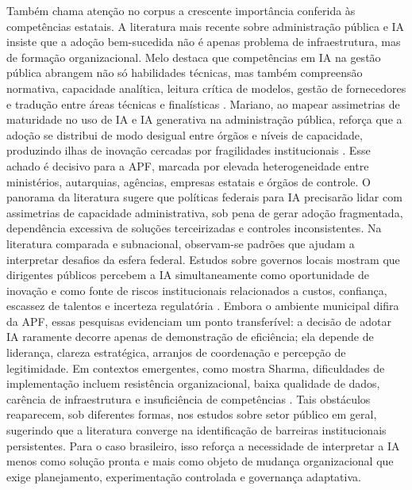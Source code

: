 \documentclass[12pt,a4paper]{article}
\begin{document}
Também chama atenção no corpus a crescente importância conferida às competências estatais. A literatura mais recente sobre administração pública e IA insiste que a adoção bem-sucedida não é apenas problema de infraestrutura, mas de formação organizacional. Melo destaca que competências em IA na gestão pública abrangem não só habilidades técnicas, mas também compreensão normativa, capacidade analítica, leitura crítica de modelos, gestão de fornecedores e tradução entre áreas técnicas e finalísticas \autocite{melo2026competencias}. Mariano, ao mapear assimetrias de maturidade no uso de IA e IA generativa na administração pública, reforça que a adoção se distribui de modo desigual entre órgãos e níveis de capacidade, produzindo ilhas de inovação cercadas por fragilidades institucionais \autocite{mariano2026inteligencia}. Esse achado é decisivo para a APF, marcada por elevada heterogeneidade entre ministérios, autarquias, agências, empresas estatais e órgãos de controle. O panorama da literatura sugere que políticas federais para IA precisarão lidar com assimetrias de capacidade administrativa, sob pena de gerar adoção fragmentada, dependência excessiva de soluções terceirizadas e controles inconsistentes.
Na literatura comparada e subnacional, observam-se padrões que ajudam a interpretar desafios da esfera federal. Estudos sobre governos locais mostram que dirigentes públicos percebem a IA simultaneamente como oportunidade de inovação e como fonte de riscos institucionais relacionados a custos, confiança, escassez de talentos e incerteza regulatória \autocite{yiitcanlar2022artificial} \autocite{david2023understanding}. Embora o ambiente municipal difira da APF, essas pesquisas evidenciam um ponto transferível: a decisão de adotar IA raramente decorre apenas de demonstração de eficiência; ela depende de liderança, clareza estratégica, arranjos de coordenação e percepção de legitimidade. Em contextos emergentes, como mostra Sharma, dificuldades de implementação incluem resistência organizacional, baixa qualidade de dados, carência de infraestrutura e insuficiência de competências \autocite{sharma2021implementing}. Tais obstáculos reaparecem, sob diferentes formas, nos estudos sobre setor público em geral, sugerindo que a literatura converge na identificação de barreiras institucionais persistentes. Para o caso brasileiro, isso reforça a necessidade de interpretar a IA menos como solução pronta e mais como objeto de mudança organizacional que exige planejamento, experimentação controlada e governança adaptativa.
\end{document}
